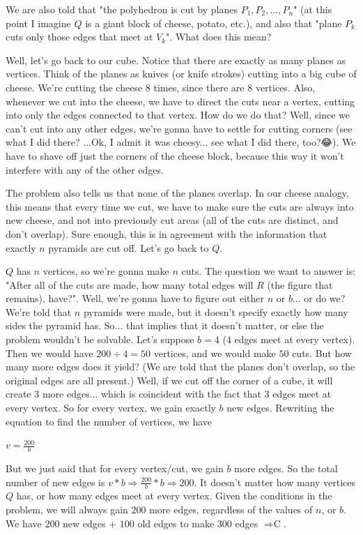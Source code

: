 \begin{enumerate}
 
We are also told that "the polyhedron is cut by planes $P_1, P_2,...,P_n$" (at this point I imagine $Q$ is a giant block of cheese, potato, etc.), and also that "plane $P_k$ cuts only those edges that meet at $V_k$". What does this mean?

 
Well, let's go back to our cube. Notice that there are exactly as many planes as vertices. Think of the planes as knives (or knife strokes) cutting into a big cube of cheese. We're cutting the cheese $8$ times, since there are $8$ vertices. Also, whenever we cut into the cheese, we have to direct the cuts near a vertex, cutting into only the edges connected to that vertex. How do we do that? Well, since we can't cut into any other edges, we're gonna have to settle for cutting corners (see what I did there? ...Ok, I admit it was cheesy... see what I did there, too?😂). We have to shave off just the corners of the cheese block, because this way it won't interfere with any of the other edges.

 
The problem also tells us that none of the planes overlap. In our cheese analogy, this means that every time we cut, we have to make sure the cuts are always into new cheese, and not into previously cut areas (all of the cuts are distinct, and don't overlap). Sure enough, this is in agreement with the information that exactly $n$ pyramids are cut off. Let's go back to $Q$.

 
$Q$ has $n$ vertices, so we're gonna make $n$ cuts. The question we want to answer is: "After all of the cuts are made, how many total edges will $R$ (the figure that remains), have?". Well, we're gonna have to figure out either $n$ or $b$... or do we? We're told that $n$ pyramids were made, but it doesn't specify exactly how many sides the pyramid has. So... that implies that it doesn't matter, or else the problem wouldn't be solvable. Let's suppose $b = 4$ ($4$ edges meet at every vertex). Then we would have $200 \div 4 = 50$ vertices, and we would make $50$ cuts. But how many more edges does it yield? (We are told that the planes don't overlap, so the original edges are all present.) Well, if we cut off the corner of a cube, it will create $3$ more edges... which is coincident with the fact that $3$ edges meet at every vertex. So for every vertex, we gain exactly $b$ new edges. Rewriting the equation to find the number of vertices, we have

 
$v = \frac{200}{b}$

 
But we just said that for every vertex/cut, we gain $b$ more edges. So the total number of new edges is $v*b \Rightarrow \frac{200}{b}*b \Rightarrow 200$. It doesn't matter how many vertices $Q$ has, or how many edges meet at every vertex. Given the conditions in the problem, we will always gain $200$ more edges, regardless of the values of $n$, or $b$. We have $200$ new edges $+$ $100$ old edges to make $300$ edges $\Rightarrow \boxed{\text{C}}$.


\end{enumerate}
